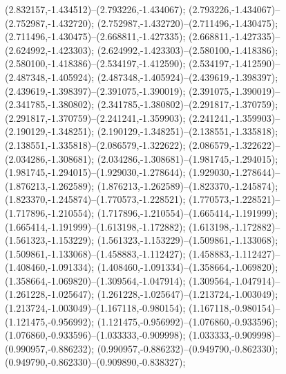  (2.832157,-1.434512)--(2.793226,-1.434067);
 (2.793226,-1.434067)--(2.752987,-1.432720);
 (2.752987,-1.432720)--(2.711496,-1.430475);
 (2.711496,-1.430475)--(2.668811,-1.427335);
 (2.668811,-1.427335)--(2.624992,-1.423303);
 (2.624992,-1.423303)--(2.580100,-1.418386);
 (2.580100,-1.418386)--(2.534197,-1.412590);
 (2.534197,-1.412590)--(2.487348,-1.405924);
 (2.487348,-1.405924)--(2.439619,-1.398397);
 (2.439619,-1.398397)--(2.391075,-1.390019);
 (2.391075,-1.390019)--(2.341785,-1.380802);
 (2.341785,-1.380802)--(2.291817,-1.370759);
 (2.291817,-1.370759)--(2.241241,-1.359903);
 (2.241241,-1.359903)--(2.190129,-1.348251);
 (2.190129,-1.348251)--(2.138551,-1.335818);
 (2.138551,-1.335818)--(2.086579,-1.322622);
 (2.086579,-1.322622)--(2.034286,-1.308681);
 (2.034286,-1.308681)--(1.981745,-1.294015);
 (1.981745,-1.294015)--(1.929030,-1.278644);
 (1.929030,-1.278644)--(1.876213,-1.262589);
 (1.876213,-1.262589)--(1.823370,-1.245874);
 (1.823370,-1.245874)--(1.770573,-1.228521);
 (1.770573,-1.228521)--(1.717896,-1.210554);
 (1.717896,-1.210554)--(1.665414,-1.191999);
 (1.665414,-1.191999)--(1.613198,-1.172882);
 (1.613198,-1.172882)--(1.561323,-1.153229);
 (1.561323,-1.153229)--(1.509861,-1.133068);
 (1.509861,-1.133068)--(1.458883,-1.112427);
 (1.458883,-1.112427)--(1.408460,-1.091334);
 (1.408460,-1.091334)--(1.358664,-1.069820);
 (1.358664,-1.069820)--(1.309564,-1.047914);
 (1.309564,-1.047914)--(1.261228,-1.025647);
 (1.261228,-1.025647)--(1.213724,-1.003049);
 (1.213724,-1.003049)--(1.167118,-0.980154);
 (1.167118,-0.980154)--(1.121475,-0.956992);
 (1.121475,-0.956992)--(1.076860,-0.933596);
 (1.076860,-0.933596)--(1.033333,-0.909998);
 (1.033333,-0.909998)--(0.990957,-0.886232);
 (0.990957,-0.886232)--(0.949790,-0.862330);
 (0.949790,-0.862330)--(0.909890,-0.838327);
